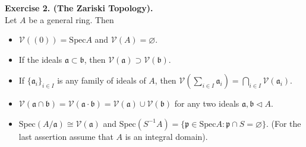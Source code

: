 \documentclass[12pt,a4paper,footinclude=true,headinclude=true]{scrbook} %
\newenvironment{exe}[2][Exercise]
    { \begin{mdframed}[backgroundcolor=gray!20] \textbf{#1 #2.}\\ }
    {  \end{mdframed}}
\begin{document}
\begin{exe}{2. (The Zariski Topology)}
    Let $A$ be a general ring. Then
    \begin{itemize}
        \item[(a)] $\mathcal{V}((0))=\mathrm{Spec}A$ and $\mathcal{V}(A)=\varnothing$.
        \item[(a*)] If the ideals $\mathfrak{a}\subset\mathfrak{b}$, then $\mathcal{V}(\mathfrak{a})\supset\mathcal{V}(\mathfrak{b})$.
        \item[(b)] If $\{\mathfrak{a}_i\}_{i\in I}$ is any family of ideals of $A$, then $\mathcal{V}(\sum_{i\in I}\mathfrak{a}_i)=\bigcap_{i\in I}\mathcal{V}(\mathfrak{a}_i)$.
        \item[(c)] $\mathcal{V}(\mathfrak{a}\cap\mathfrak{b})=\mathcal{V}(\mathfrak{a}\cdot\mathfrak{b})=\mathcal{V}(\mathfrak{a})\cup\mathcal{V}(\mathfrak{b})$ for any two ideals $\mathfrak{a},\mathfrak{b}\triangleleft A$.
        \item[(d)] $\mathrm{Spec}(A/\mathfrak{a})\cong\mathcal{V}(\mathfrak{a})$ and $\mathrm{Spec}(S^{-1}A)=\{\mathfrak{p}\in\mathrm{Spec}A:\mathfrak{p}\cap S=\varnothing\}$. (For the last assertion assume that $A$ is an integral domain).
    \end{itemize}
\end{exe}
\end{document}
